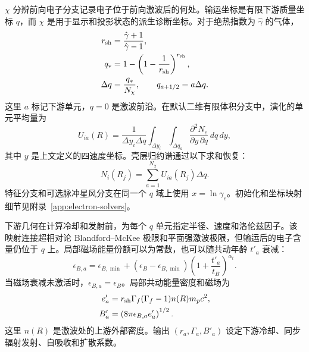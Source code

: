 \documentclass[twocolumn]{aastex702}
\begin{document}
\(\chi\) 分辨前向电子分支记录电子位于前向激波后的何处。输运坐标是有限下游质量坐标 \(q\)，而 \(\chi\) 是用于显示和投影状态的派生诊断坐标。对于绝热指数为 \(\hat\gamma\) 的气体，
\begin{equation}
\begin{aligned}
r_{\rm sh}&=\frac{\hat\gamma+1}{\hat\gamma-1},\\
q_\ast&=1-\left(1-\frac{1}{r_{\rm sh}}\right)^{r_{\rm sh}},\\
\Delta q&=\frac{q_\ast}{N_\chi},\qquad
q_{a+1/2}=a\Delta q .
\end{aligned}
\end{equation}
这里 \(a\) 标记下游单元，\(q=0\) 是激波前沿。在默认二维有限体积分支中，演化的单元平均量为
\begin{equation}
U_{ia}(R)=\frac{1}{\Delta y_i\Delta q}
\int_{\Delta y_i}\int_{\Delta q_a}
\frac{\partial^2 N_e}{\partial y\,\partial q}\,dq\,dy ,
\end{equation}
其中 \(y\) 是上文定义的四速度坐标。壳层归约谱通过以下求和恢复：
\begin{equation}
N_i(R_j)=\sum_{a=1}^{N_\chi}U_{ia}(R_j)\Delta q .
\end{equation}
特征分支和可选脉冲星风分支在同一个 \(q\) 域上使用 \(x=\ln\gamma_e\)。初始化和坐标映射细节见附录~\ref{app:electron-solvers}。

下游几何在计算冷却和发射前，为每个 \(q\) 单元指定半径、速度和洛伦兹因子。该映射连接超相对论 Blandford--McKee 极限和平面强激波极限，但输运后的电子含量仍位于 \(q\) 上。局部磁场能量份额可以为常数，也可以随共动年龄 \(t'_a\) 衰减：
\begin{equation}
\epsilon_{B,a}=\epsilon_{B,\min}
 +(\epsilon_B-\epsilon_{B,\min})
\left(1+\frac{t'_a}{t_B}\right)^{\alpha_t}.
\end{equation}
当磁场衰减未激活时，\(\epsilon_{B,a}=\epsilon_B\)。局部共动能量密度和磁场为
\begin{equation}
\begin{aligned}
e'_a&=r_{\rm sh}\Gamma_f(\Gamma_f-1)n(R)m_p c^2,\\
B'_a&=\left(8\pi\epsilon_{B,a}e'_a\right)^{1/2}.
\end{aligned}
\end{equation}
这里 \(n(R)\) 是激波处的上游外部密度。输出 \((r_a,\Gamma_a,B'_a)\) 设定下游冷却、同步辐射发射、自吸收和扩散系数。
\end{document}
